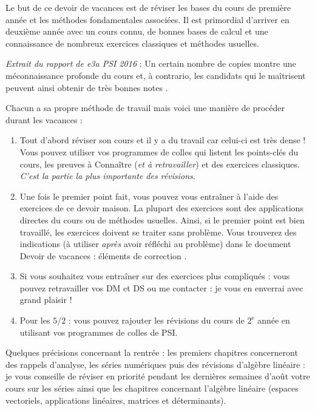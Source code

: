\documentclass[a4paper,twoside,french,11pt]{VcCours}
\begin{document}

Le but de ce devoir de vacances est de réviser les bases du cours de première année et les méthodes fondamentales associées. Il est primordial d'arriver en deuxième année avec un cours connu, de bonnes bases de calcul et une connaissance de nombreux exercices classiques et méthodes usuelles.

\textit{Extrait du rapport de e3a PSI 2016} : \og Un certain nombre de copies montre une méconnaissance profonde du cours et, à contrario, les candidats qui le maîtrisent peuvent ainsi obtenir de très bonnes notes \fg .

Chacun a sa propre méthode de travail mais voici une manière de procéder durant les vacances :

\begin{enumerate}
\item Tout d'abord réviser son cours et il y a du travail car celui-ci est très dense ! Vous pouvez utiliser vos programmes de colles qui listent les points-clés du cours, les preuves à Connaître (\textit{et à retravailler}) et des exercices classiques. \textit{C'est la partie la plus importante des révisions}.
\item Une fois le premier point fait, vous pouvez vous entraîner à l'aide des exercices de ce devoir maison. La plupart des exercices sont des applications directes du cours ou de méthodes usuelles. Ainsi, si le premier point est bien travaillé, les exercices doivent se traiter sans problème. Vous trouverez des indications (à utiliser \textit{après} avoir réfléchi au problème) dans le document \og Devoir de vacances : éléments de correction \fg .
\item Si vous souhaitez vous entraîner sur des exercices plus compliqués : vous pouvez retravailler vos DM et DS ou me contacter : je vous en enverrai avec grand plaisir !
\item Pour les $5/2$ : vous pouvez rajouter les révisions du cours de $2^{\text{e}}$ année en utilisant vos programmes de colles de PSI.
\end{enumerate}

Quelques précisions concernant la rentrée : les premiers chapitres concerneront 
des rappels d'analyse, les séries numériques puis des révisions d'algèbre 
linéaire : je vous conseille de réviser en priorité pendant les dernières 
semaines d'août votre cours sur les séries ainsi que les chapitres concernant 
l'algèbre linéaire (espaces vectoriels, applications linéaires, matrices et 
déterminants).
\end{document}
